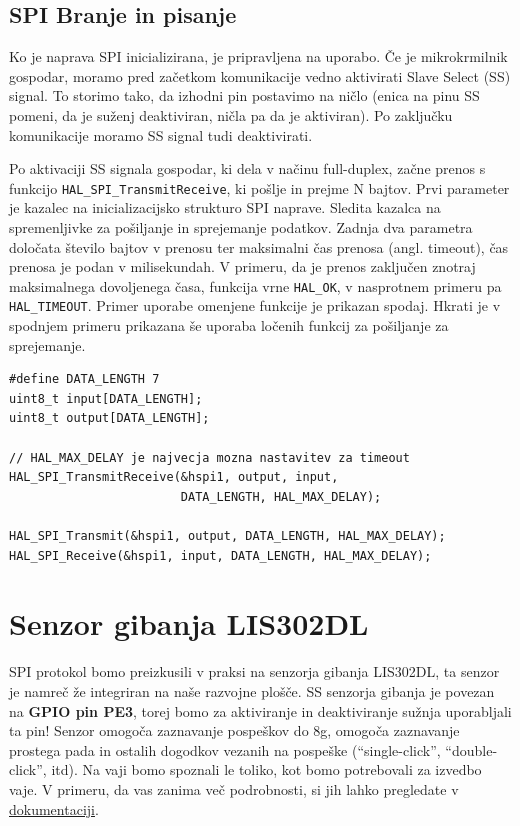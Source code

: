 \documentclass[12pt,letterpaper]{article}
\begin{document}
\subsection*{SPI Branje in pisanje}

Ko je naprava SPI inicializirana, je pripravljena na uporabo. Če je mikrokrmilnik gospodar, moramo pred začetkom komunikacije vedno aktivirati Slave Select (SS) signal. To storimo tako, da izhodni pin postavimo na ničlo (enica na pinu SS pomeni, da je suženj deaktiviran, ničla pa da je aktiviran). Po zaključku komunikacije moramo SS signal tudi deaktivirati.

Po aktivaciji SS signala gospodar, ki dela v načinu full-duplex, začne prenos s funkcijo \texttt{HAL\_SPI\_TransmitReceive}, ki pošlje in prejme N bajtov. Prvi parameter je kazalec na inicializacijsko strukturo SPI naprave. Sledita kazalca na spremenljivke za pošiljanje in sprejemanje podatkov. Zadnja dva parametra določata število bajtov v prenosu ter maksimalni čas prenosa (angl. timeout), čas prenosa je podan v milisekundah. V primeru, da je prenos zaključen znotraj maksimalnega dovoljenega časa, funkcija vrne \texttt{HAL\_OK}, v nasprotnem primeru pa \texttt{HAL\_TIMEOUT}. Primer uporabe omenjene funkcije je prikazan spodaj. Hkrati je v spodnjem primeru prikazana še uporaba ločenih funkcij za pošiljanje za sprejemanje.

\begin{center}
\begin{lstlisting}[style=CStyle]
#define DATA_LENGTH 7
uint8_t input[DATA_LENGTH];
uint8_t output[DATA_LENGTH];

// HAL_MAX_DELAY je najvecja mozna nastavitev za timeout
HAL_SPI_TransmitReceive(&hspi1, output, input,
                        DATA_LENGTH, HAL_MAX_DELAY);

HAL_SPI_Transmit(&hspi1, output, DATA_LENGTH, HAL_MAX_DELAY);
HAL_SPI_Receive(&hspi1, input, DATA_LENGTH, HAL_MAX_DELAY);
\end{lstlisting}
\end{center}


\section*{Senzor gibanja LIS302DL}

SPI protokol bomo preizkusili v praksi na senzorja gibanja LIS302DL, ta senzor je namreč že integriran na naše razvojne plošče. SS senzorja gibanja je povezan na \textbf{GPIO pin PE3}, torej bomo za aktiviranje in deaktiviranje sužnja uporabljali ta pin! Senzor omogoča zaznavanje pospeškov do 8g, omogoča zaznavanje prostega pada in ostalih dogodkov vezanih na pospeške (``single-click'', ``double-click'', itd). Na vaji bomo spoznali le toliko, kot bomo potrebovali za izvedbo vaje. V primeru, da vas zanima več podrobnosti, si jih lahko pregledate v \href{https://www.st.com/content/ccc/resource/technical/document/application_note/e9/75/73/ca/41/5c/42/14/CD00098549.pdf/files/CD00098549.pdf/jcr:content/translations/en.CD00098549.pdf}{dokumentaciji}.
\end{document}
